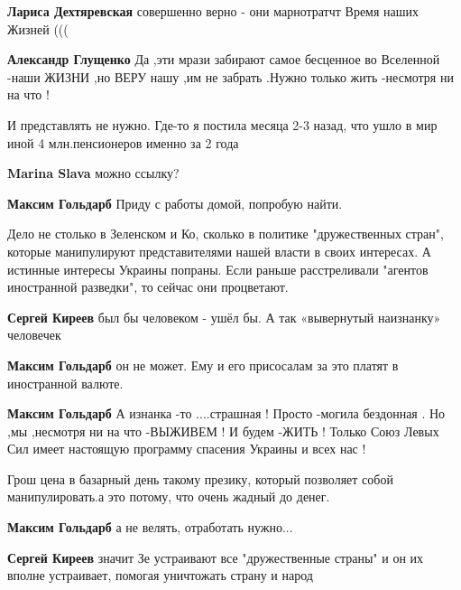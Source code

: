 \begin{itemize}
\begin{itemize}
\textbf{Лариса Дехтяревская} совершенно верно - они марнотратчт Время наших Жизней (((

\textbf{Александр Глущенко} Да ,эти мрази забирают самое бесценное во Вселенной -наши ЖИЗНИ ,но ВЕРУ нашу ,им не забрать .Нужно только жить -несмотря ни на что !
\end{itemize} %


И представлять не нужно. Где-то я постила месяца 2-3 назад, что ушло в мир иной
4 млн.пенсионеров именно за 2 года

\begin{itemize} %
\textbf{Marina Slava} можно ссылку?

\textbf{Максим Гольдарб} Приду с работы домой, попробую найти.
\end{itemize} %


Дело не столько в Зеленском и Ко, сколько в политике "дружественных стран",
которые манипулируют представителями нашей власти в своих интересах. А истинные
интересы Украины попраны. Если раньше расстреливали "агентов иностранной
разведки", то сейчас они процветают.

\begin{itemize} %
\textbf{Сергей Киреев} был бы человеком - ушёл бы. А так «вывернутый наизнанку» человечек

\textbf{Максим Гольдарб} он не может. Ему и его присосалам за это платят в иностранной валюте.

\textbf{Максим Гольдарб} А изнанка -то ....страшная ! Просто -могила бездонная . Но ,мы ,несмотря ни на что -ВЫЖИВЕМ ! И будем -ЖИТЬ ! Только Союз Левых Сил имеет настоящую программу спасения Украины и всех нас !

Грош цена в базарный день такому презику, который позволяет собой манипулировать.а это потому, что очень жадный до денег.

\textbf{Максим Гольдарб} а не велять, отработать нужно...

\textbf{Сергей Киреев} значит Зе устраивают все "дружественные страны" и он их вполне устраивает, помогая уничтожать страну и народ
\end{itemize} %



\end{itemize}

